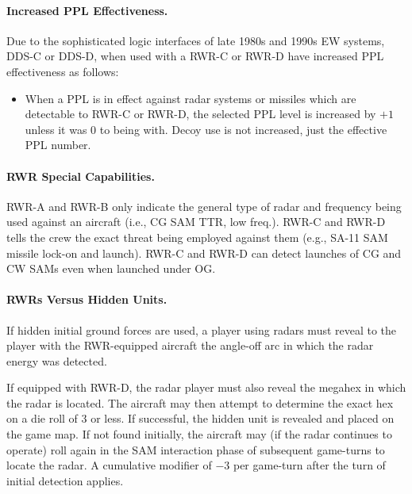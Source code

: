 \begin{advancedrules}
\paragraph{Increased PPL Effectiveness.} Due to the sophisticated logic interfaces of late 1980s and 1990s EW systems, DDS-C or DDS-D, when used with a RWR-C or RWR-D have increased PPL effectiveness as follows:

\begin{itemize}
    \item When a PPL is in effect against radar systems or missiles which are detectable to RWR-C or RWR-D, the selected PPL level is increased by $+1$ unless it was 0 to being with. Decoy use is not increased, just the effective PPL number.
\end{itemize}

\paragraph{RWR Special Capabilities.} RWR-A and RWR-B only indicate the general type of radar and frequency being used against an aircraft (i.e., CG SAM TTR, low freq.). RWR-C and RWR-D tells the crew the exact threat being employed against them (e.g., SA-11 SAM missile lock-on and launch). RWR-C and RWR-D can detect launches of CG and CW SAMs even when launched under OG.

\paragraph{RWRs Versus Hidden Units.} If hidden initial ground forces are used, a player using radars must reveal to the player with the RWR-equipped aircraft the angle-off arc in which the radar energy was detected.

If equipped with RWR-D, the radar player must also reveal the megahex in which the radar is located. The aircraft may then attempt to determine the exact hex on a die roll of 3 or less. If successful, the hidden unit is revealed and placed on the game map. If not found initially, the aircraft may (if the radar continues to operate) roll again in the SAM interaction phase of subsequent game-turns to locate the radar. A cumulative modifier of $-3$ per game-turn after the turn of initial detection applies.

\end{advancedrules}
